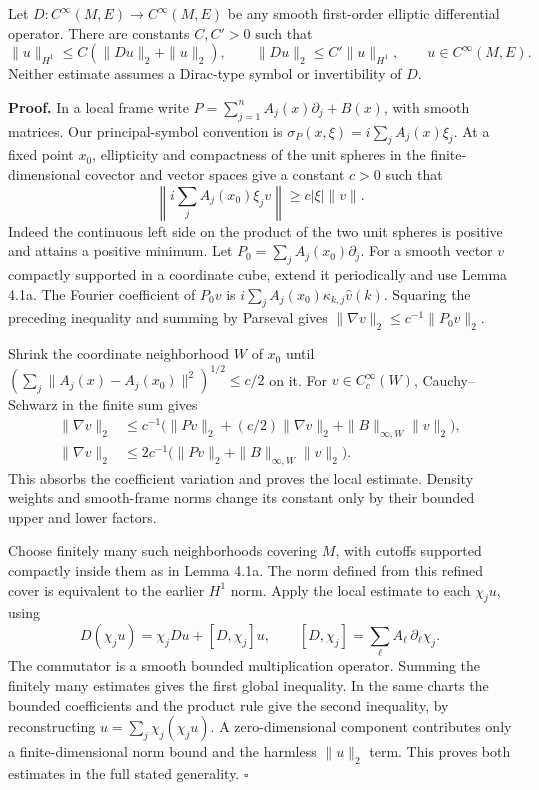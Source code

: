 \documentclass[
  11pt,
]{article}
\begin{document}
Let \(D:C^\infty(M,E)\to C^\infty(M,E)\) be any smooth first-order
elliptic differential operator. There are constants \(C,C'>0\) such that
\[
\|u\|_{H^1}\leq C(\|Du\|_2+\|u\|_2),
\qquad \|Du\|_2\leq C'\|u\|_{H^1},
\qquad u\in C^\infty(M,E).
\] Neither estimate assumes a Dirac-type symbol or invertibility of
\(D\).

\textbf{Proof.} In a local frame write
\(P=\sum_{j=1}^n A_j(x)\partial_j+B(x)\), with smooth matrices. Our
principal-symbol convention is \(\sigma_P(x,\xi)=i\sum_jA_j(x)\xi_j\).
At a fixed point \(x_0\), ellipticity and compactness of the unit
spheres in the finite-dimensional covector and vector spaces give a
constant \(c>0\) such that \[
\left\|i\sum_jA_j(x_0)\xi_j v\right\|
\geq c|\xi|\|v\| .
\] Indeed the continuous left side on the product of the two unit
spheres is positive and attains a positive minimum. Let
\(P_0=\sum_jA_j(x_0)\partial_j\). For a smooth vector \(v\) compactly
supported in a coordinate cube, extend it periodically and use Lemma
4.1a. The Fourier coefficient of \(P_0v\) is
\(i\sum_jA_j(x_0)\kappa_{k,j}\widehat v(k)\). Squaring the preceding
inequality and summing by Parseval gives
\(\|\nabla v\|_2\leq c^{-1}\|P_0v\|_2\).

Shrink the coordinate neighborhood \(W\) of \(x_0\) until
\((\sum_j\|A_j(x)-A_j(x_0)\|^2)^{1/2}\leq c/2\) on it. For
\(v\in C_c^\infty(W)\), Cauchy--Schwarz in the finite sum gives \[
\begin{aligned}
\|\nabla v\|_2
&\leq c^{-1}\big(\|Pv\|_2
+(c/2)\|\nabla v\|_2+\|B\|_{\infty,W}\|v\|_2\big),\\
\|\nabla v\|_2
&\leq 2c^{-1}\big(\|Pv\|_2+\|B\|_{\infty,W}\|v\|_2\big).
\end{aligned}
\] This absorbs the coefficient variation and proves the local estimate.
Density weights and smooth-frame norms change its constant only by their
bounded upper and lower factors.

Choose finitely many such neighborhoods covering \(M\), with cutoffs
supported compactly inside them as in Lemma 4.1a. The norm defined from
this refined cover is equivalent to the earlier \(H^1\) norm. Apply the
local estimate to each \(\chi_ju\), using \[
D(\chi_ju)=\chi_jDu+[D,\chi_j]u,
\qquad [D,\chi_j]=\sum_\ell A_\ell\,\partial_\ell\chi_j .
\] The commutator is a smooth bounded multiplication operator. Summing
the finitely many estimates gives the first global inequality. In the
same charts the bounded coefficients and the product rule give the
second inequality, by reconstructing \(u=\sum_j\chi_j(\chi_ju)\). A
zero-dimensional component contributes only a finite-dimensional norm
bound and the harmless \(\|u\|_2\) term. This proves both estimates in
the full stated generality. \(\square\)
\end{document}
